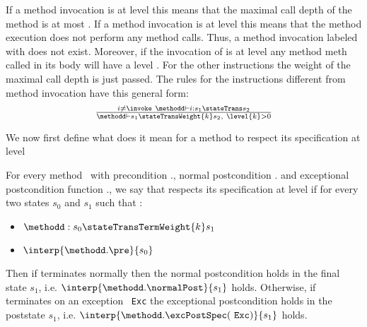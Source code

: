 If a method invocation is at level  this means that the maximal call depth of the method is at most  .
If a method invocation is at level  this means that the method execution does not perform any method calls.
Thus, a method invocation labeled with  does not exist. Moreover, if the invocation of  \methodd{}
 is at level  any method \mbox{\rm meth}  called in its body will have a level . 
 For the other instructions the weight of the maximal call depth is just passed. The rules for the instructions different from 
method invocation have this general form: 
$$ \begin{array}{l}
              \frac{ i \neq \invoke \  \methodd \vdash  i: s_1 \stateTrans s_2 }{ \methodd \vdash s_1 \stateTransWeight{k} s_2 , \  \level{k} > 0}
\end{array}$$
 
We now first define what does it mean for a method to respect its specification at level 
\begin{defCorrect} \label{defCorrectLevel}
For every method \methodd \ with precondition \methodd.\pre, normal postcondition \methodd.\normalPost{}
and exceptional postcondition function \methodd.\excPostSpec, we say that \methodd{} respects its specification at level  if 
for every two states $s_0$ and $s_1$ such that :
\begin{itemize}
      
      \item   $\methodd : s_0  \stateTransTermWeight{k} s_1   $
      \item   $ \interp{\methodd.\pre }{ s_0 }$
\end{itemize}
Then if \methodd{} terminates normally then the normal postcondition holds in the final state $s_1 $, i.e.  $\interp{\methodd.\normalPost}{s_1}$ holds. 
Otherwise, if  \methodd{}  terminates on an exception \mbox{ \rm \texttt{Exc}} the exceptional postcondition holds in the poststate $s_1 $, i.e.
$ \interp{\methodd.\excPostSpec(  \mbox{ \rm \texttt{Exc}} )}{s_1} $ holds.
\end{defCorrect}

